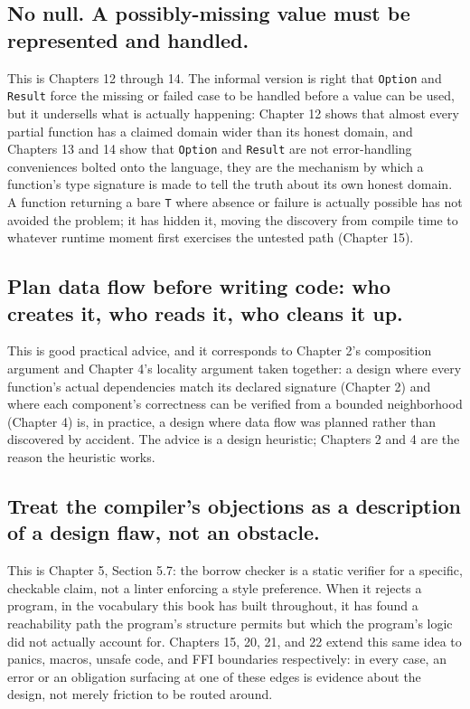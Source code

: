 \documentclass[11pt]{book}
\begin{document}
\subsection*{No null. A possibly-missing value must be represented and handled.}

This is Chapters 12 through 14. The informal version is right that \texttt{Option} and \texttt{Result} force the missing or failed case to be handled before a value can be used, but it undersells what is actually happening: Chapter 12 shows that almost every partial function has a claimed domain wider than its honest domain, and Chapters 13 and 14 show that \texttt{Option} and \texttt{Result} are not error-handling conveniences bolted onto the language, they are the mechanism by which a function's type signature is made to tell the truth about its own honest domain. A function returning a bare \texttt{T} where absence or failure is actually possible has not avoided the problem; it has hidden it, moving the discovery from compile time to whatever runtime moment first exercises the untested path (Chapter 15).

\subsection*{Plan data flow before writing code: who creates it, who reads it, who cleans it up.}

This is good practical advice, and it corresponds to Chapter 2's composition argument and Chapter 4's locality argument taken together: a design where every function's actual dependencies match its declared signature (Chapter 2) and where each component's correctness can be verified from a bounded neighborhood (Chapter 4) is, in practice, a design where data flow was planned rather than discovered by accident. The advice is a design heuristic; Chapters 2 and 4 are the reason the heuristic works.

\subsection*{Treat the compiler's objections as a description of a design flaw, not an obstacle.}

This is Chapter 5, Section 5.7: the borrow checker is a static verifier for a specific, checkable claim, not a linter enforcing a style preference. When it rejects a program, in the vocabulary this book has built throughout, it has found a reachability path the program's structure permits but which the program's logic did not actually account for. Chapters 15, 20, 21, and 22 extend this same idea to panics, macros, unsafe code, and FFI boundaries respectively: in every case, an error or an obligation surfacing at one of these edges is evidence about the design, not merely friction to be routed around.
\end{document}
